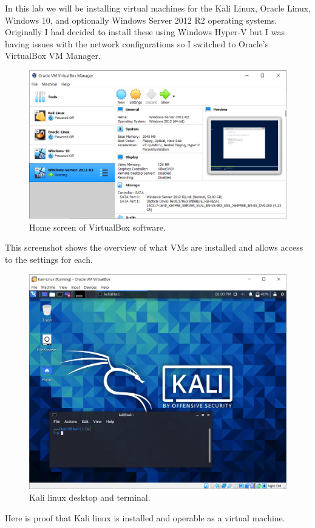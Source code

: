 In this lab we will be installing virtual machines for the Kali Linux, Oracle Linux, Windows 10, and optionally Windows Server 2012 R2 operating systems.
Originally I had decided to install these using Windows Hyper-V but I was having issues with the network configurations so I switched to Oracle's VirtualBox VM Manager.

\begin{figure}[H]
    \centering
    \includegraphics[width=\linewidth]{figures/Virtualbox-Home.png}
    \caption{Home screen of VirtualBox software.}
\end{figure}
This screenshot shows the overview of what VMs are installed and allows access to the settings for each.

\begin{figure}[H]
    \centering
    \includegraphics[width=\linewidth]{figures/Kali-Home.png}
    \caption{Kali linux desktop and terminal.}
\end{figure}
Here is proof that Kali linux is installed and operable as a virtual machine.

